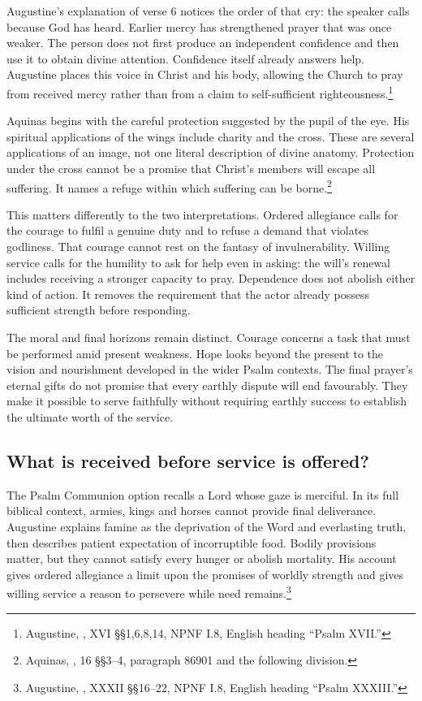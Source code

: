 Augustine's explanation of verse 6 notices the order of that cry: the speaker calls because God has heard. Earlier mercy has strengthened prayer that was once weaker. The person does not first produce an independent confidence and then use it to obtain divine attention. Confidence itself already answers help. Augustine places this voice in Christ and his body, allowing the Church to pray from received mercy rather than from a claim to self-sufficient righteousness.\footnote{Augustine, , XVI §§1,6,8,14, NPNF I.8, English heading ``Psalm XVII.''}

Aquinas begins with the careful protection suggested by the pupil of the eye. His spiritual applications of the wings include charity and the cross. These are several applications of an image, not one literal description of divine anatomy. Protection under the cross cannot be a promise that Christ's members will escape all suffering. It names a refuge within which suffering can be borne.\footnote{Aquinas, , 16 §§3--4, paragraph 86901 and the following division.}

This matters differently to the two interpretations. Ordered allegiance calls for the courage to fulfil a genuine duty and to refuse a demand that violates godliness. That courage cannot rest on the fantasy of invulnerability. Willing service calls for the humility to ask for help even in asking: the will's renewal includes receiving a stronger capacity to pray. Dependence does not abolish either kind of action. It removes the requirement that the actor already possess sufficient strength before responding.

The moral and final horizons remain distinct. Courage concerns a task that must be performed amid present weakness. Hope looks beyond the present to the vision and nourishment developed in the wider Psalm contexts. The final prayer's eternal gifts do not promise that every earthly dispute will end favourably. They make it possible to serve faithfully without requiring earthly success to establish the ultimate worth of the service.

\subsection{What is received before service is offered?}
The Psalm Communion option recalls a Lord whose gaze is merciful. In its full biblical context, armies, kings and horses cannot provide final deliverance. Augustine explains famine as the deprivation of the Word and everlasting truth, then describes patient expectation of incorruptible food. Bodily provisions matter, but they cannot satisfy every hunger or abolish mortality. His account gives ordered allegiance a limit upon the promises of worldly strength and gives willing service a reason to persevere while need remains.\footnote{Augustine, , XXXII §§16--22, NPNF I.8, English heading ``Psalm XXXIII.''}

